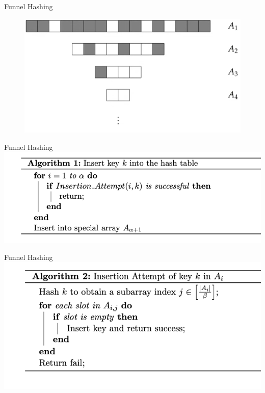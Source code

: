 \documentclass{beamer}
\begin{document}
\begin{frame}{Funnel Hashing}
	\begin{figure}
		\includegraphics[scale=0.5]{funnel_hash.png}
	\end{figure}
\end{frame}

\begin{frame}{Funnel Hashing}
	\includegraphics{insert}
\end{frame}

\begin{frame}{Funnel Hashing}
	\includegraphics{insertion-attempt}
\end{frame}
\end{document}
